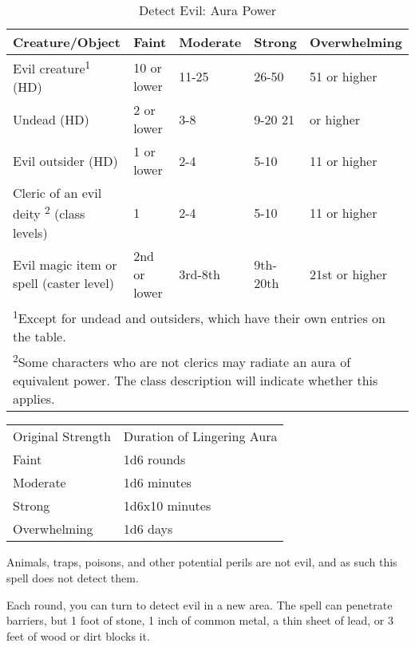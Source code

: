 \begin{multicols}{2}
\begin{small}
\begin{center}
\begin{table*}[b!]
\caption{Detect Evil: Aura Power}
\begin{tabular}[h!]{l|llll}
Creature/Object &	Faint & Moderate & Strong & Overwhelming \\ \hline
Evil creature\textsuperscript{1} (HD) & 10 or lower &	11-25 & 26-50 & 51 or higher \\	   
Undead (HD) & 2 or lower & 3-8 & 9-20	21 & or higher \\
Evil outsider (HD) & 1 or lower & 2-4 & 5-10 & 11 or higher \\
Cleric of an evil deity \textsuperscript{2} (class levels) & 1 & 2-4 & 5-10 & 11 or higher \\
Evil magic item or spell (caster level) & 2nd or lower & 3rd-8th & 9th-20th & 21st or higher \\
\multicolumn{5}{l}{\textsuperscript{1}{Except for undead and outsiders, which have their own entries on the table.}} \\
\multicolumn{5}{p{6in}}{\textsuperscript{2}{Some characters who are not clerics may radiate an aura of equivalent power. The class description will indicate whether this applies.}} \\
\end{tabular}
\end{table*}
\end{center}

\begin{center}
\begin{tabular}[h!]{l|l}
Original Strength & Duration of Lingering Aura \\
Faint & 1d6 rounds \\
Moderate & 1d6 minutes \\
Strong & 1d6x10 minutes \\
Overwhelming & 1d6 days \\
\end{tabular}
\end{center}

\smallskip\noindent Animals, traps, poisons, and other potential perils are not evil, and as such this spell does not detect them.

\smallskip\noindent Each round, you can turn to detect evil in a new area. The spell can penetrate barriers, but 1 foot of stone, 1 inch of common metal, a thin sheet of lead, or 3 feet of wood or dirt blocks it.


\end{small}
\end{multicols}
